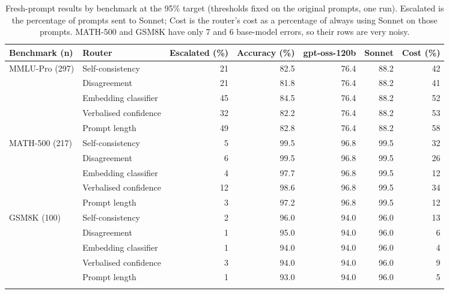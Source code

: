 \begin{table}[!htbp]
\centering\small
\caption{Fresh-prompt results by benchmark at the 95\% target (thresholds fixed on the original prompts, one run). Escalated is the percentage of prompts sent to Sonnet; Cost is the router's cost as a percentage of always using Sonnet on those prompts. MATH-500 and GSM8K have only 7 and 6 base-model errors, so their rows are very noisy.}\label{tab:fresh_bench}
\begin{tabular}{llrrrrr}
\toprule
Benchmark (n) & Router & Escalated (\%) & Accuracy (\%) & gpt-oss-120b & Sonnet & Cost (\%) \\
\midrule
MMLU-Pro (297) & Self-consistency & 21 & 82.5 & 76.4 & 88.2 & 42 \\
 & Disagreement & 21 & 81.8 & 76.4 & 88.2 & 41 \\
 & Embedding classifier & 45 & 84.5 & 76.4 & 88.2 & 52 \\
 & Verbalised confidence & 32 & 82.2 & 76.4 & 88.2 & 53 \\
 & Prompt length & 49 & 82.8 & 76.4 & 88.2 & 58 \\
\addlinespace
MATH-500 (217) & Self-consistency & 5 & 99.5 & 96.8 & 99.5 & 32 \\
 & Disagreement & 6 & 99.5 & 96.8 & 99.5 & 26 \\
 & Embedding classifier & 4 & 97.7 & 96.8 & 99.5 & 12 \\
 & Verbalised confidence & 12 & 98.6 & 96.8 & 99.5 & 34 \\
 & Prompt length & 3 & 97.2 & 96.8 & 99.5 & 12 \\
\addlinespace
GSM8K (100) & Self-consistency & 2 & 96.0 & 94.0 & 96.0 & 13 \\
 & Disagreement & 1 & 95.0 & 94.0 & 96.0 & 6 \\
 & Embedding classifier & 1 & 94.0 & 94.0 & 96.0 & 4 \\
 & Verbalised confidence & 3 & 94.0 & 94.0 & 96.0 & 9 \\
 & Prompt length & 1 & 93.0 & 94.0 & 96.0 & 5 \\
\addlinespace
\bottomrule
\end{tabular}
\end{table}

